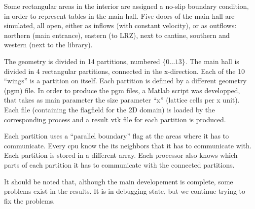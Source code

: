 \documentclass[a4paper,11pt]{article}
\begin{document}
Some rectangular areas in the interior are assigned a no-slip boundary condition,
in order to represent tables in the main hall. Five doors of the main hall are
simulated, all open, either as inflows (with constant velocity), or as outflows:
northern (main entrance), eastern (to LRZ), next to cantine, southern and western (next to the library).

The geometry is divided in 14 partitions, numbered $\{0\dots13\}$. The main hall is
divided in 4 rectangular partitions, connected in the x-direction. Each of the 10
``wings'' is a partition on itself. Each partition is defined by a different geometry (pgm)
file. In order to produce the pgm files, a Matlab script was developped, that takes
as main parameter the size parameter ``x'' (lattice cells per x unit). Each file (containing the flagfield
for the 2D domain) is loaded by the corresponding process and a result vtk file for
each partition is produced.

Each partition uses a ``parallel boundary'' flag at the areas where it has to communicate.
Every cpu know the its neighbors that it has to communicate with. Each partition
is stored in a different array. Each processor also knows which parts of each partition
it has to communicate with the connected partitions.

It should be noted that, although the main developement is complete,
some problems exist in the results. It is in debugging state, but we continue trying to
fix the problems.
\end{document}
